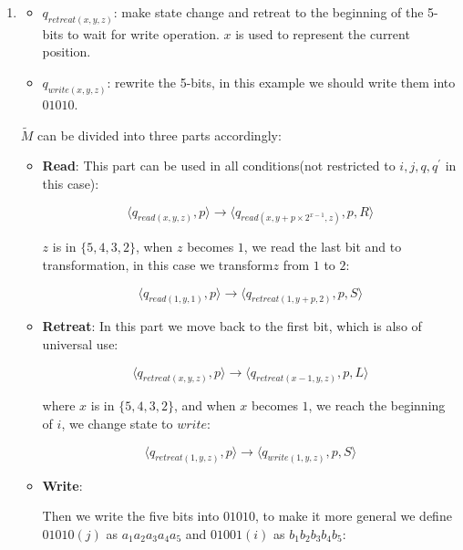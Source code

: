 \documentclass[12pt,a4paper]{article}
\makeatletter
\newtheorem*{solution}{Solution}
\theoremstyle{definition}
\renewenvironment{solution}[1][Solution] {\par\pushQED{\qed}\normalfont\topsep6\p@\@plus6\p@\relax\trivlist\item[\hskip\labelsep\bfseries#1\@addpunct{.}]\ignorespaces}{\popQED\endtrivlist\@endpefalse} \makeatother
\makeatother
\begin{document}
\begin{enumerate}
\begin{solution}
\begin{itemize}
		\item \textbf{$q_{retreat(x,y, z)}$}: make state change and retreat to the beginning of the 5-bits to wait for write operation. $x$ is used to represent the current position.
		
		\item \textbf{$q_{write(x,y,z)}$}:  rewrite the 5-bits, in this example we should write them into $01010$.
	\end{itemize}


	$\tilde{M}$ can be divided into three parts accordingly:

	
	\begin{itemize}
		\item \textbf{Read}: 
		This part can be used in all conditions(not restricted to $i,j,q,q^{'}$ in this case):

		\begin{equation*}
					\langle q_{read(x,y,z)}, p \rangle \rightarrow \langle q_{read(x,y + p\times 2^{x-1},z)}, p,   R\rangle
		\end{equation*} 
		
		$z$ is in $\{5,4,3,2\}$, when $z$ becomes $1$, we read the last bit and to transformation, in this case we transform$z$ from $1$ to $2$: 

		\begin{equation*}
			\langle q_{read(1,y,1)}, p \rangle \rightarrow \langle q_{retreat(1,y + p ,2)}, p,   S\rangle
        \end{equation*} 

		\item \textbf{Retreat}: 
		In this part we move back to the first bit, which is also of universal use:


		\begin{equation*}
					\langle q_{retreat(x,y,z)}, p \rangle \rightarrow \langle q_{retreat(x - 1,y,z)}, p,   L\rangle
		\end{equation*} 

		where $x$ is in $\{5, 4, 3, 2\}$, and when $x$ becomes $1$, we reach the beginning of $i$, we change state to $write$:

		\begin{equation*}
			\langle q_{retreat(1,y,z)}, p \rangle \rightarrow \langle q_{write(1,y,z)}, p,   S\rangle
        \end{equation*} 
		
		\item \textbf{Write}:
		 
		Then we write the five bits into $01010$, to make it more general we define $01010(j)$ as $a_1 a_2 a_3 a_4 a_5$ and $01001(i)$ as $b_1 b_2 b_3 b_4 b_5$:


\end{itemize}
\end{solution}
\end{enumerate}
\end{document}
